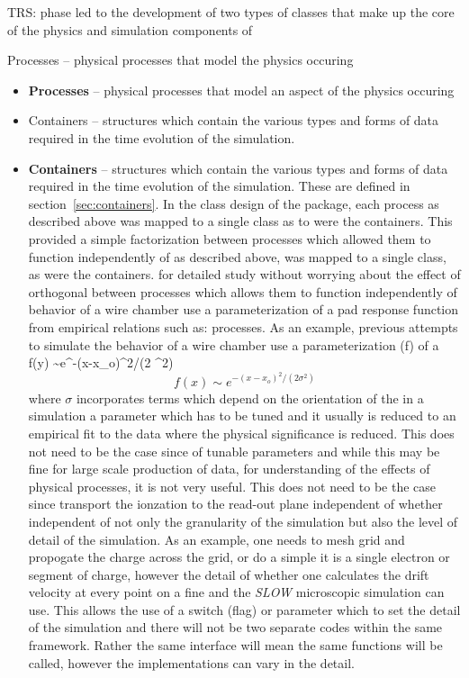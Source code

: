 \documentclass[twoside]{article}
\begin{document}
TRS:
phase led to the development of two types of classes
that make up the core of the physics and simulation components of
   \item Processes -- physical processes that model the physics occuring
\begin{itemize}
   \item {\bf Processes} -- physical processes that model an aspect of 
     the physics occuring
   \item Containers -- structures which contain the various types and
        forms of data required in the time evolution of the simulation.
   \item {\bf Containers} -- structures which contain the various types and
     forms of data required in the time evolution of the simulation.
     These are defined in section~\ref{sec:containers}. 
In the class design of the package, each process as described above
was mapped to a single class as to were the containers.
This provided a simple factorization 
between processes which allowed them to function independently of
as described above, was mapped to a single class, as were the containers.
for detailed study without worrying about the effect of orthogonal
between processes which allows them to function independently of
behavior of a wire chamber use a parameterization of a pad response
function from empirical relations such as:
processes.  As an example, previous attempts to simulate the
behavior of a wire chamber use a parameterization (f) of a 
f(y) \sim  e^{-(x-x_{o})^{2}/(2 \sigma^{2})}
\begin{equation}
f(x) \sim  e^{-(x-x_{o})^{2}/(2 \sigma^{2})}
\label{eq:alephPRF}
\end{equation}
where $\sigma$ incorporates terms which depend on the orientation of the
in a simulation a parameter which has to be tuned and it usually 
is reduced to an empirical fit to the data where the physical
significance is  reduced.  This does not need to be the case since
of tunable parameters and while this may be fine for large scale production
of data, for understanding of the effects of physical processes, it is
not very useful.  This does not need to be the case since
transport the ionzation to the read-out plane independent of whether 
independent of not only the granularity of the simulation but also
the level of detail of the simulation.  As an example, one needs to
mesh grid and propogate the charge across the grid, or do a simple
it is a single electron or segment of charge, however the detail of
whether one calculates the drift velocity at every point on a fine
and the {\em SLOW} microscopic simulation can use.  This allows
the use of a
switch (flag) or parameter which to set the detail of
the simulation and there will not be two separate codes within the
same framework.  Rather the same interface will mean the same functions
will be called, however the implementations can vary in the detail.


\end{itemize}
\end{document}
